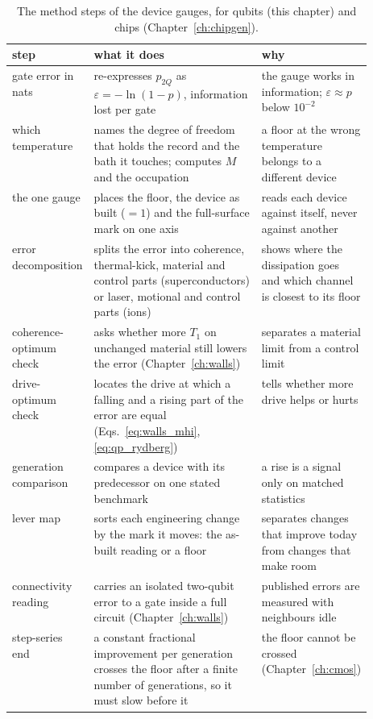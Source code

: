 \begin{table}[htbp]\centering\small
\caption{The method steps of the device gauges, for qubits (this chapter) and chips (Chapter~\ref{ch:chipgen}).}\label{tab:qp_steps}
\begin{tabularx}{\linewidth}{@{}>{\raggedright\arraybackslash}p{0.22\linewidth}>{\raggedright\arraybackslash}X>{\raggedright\arraybackslash}p{0.30\linewidth}@{}}\toprule
step & what it does & why \\\midrule
gate error in nats & re-expresses $p_{2Q}$ as $\varepsilon=-\ln(1-p)$, information lost per gate & the gauge works in information; $\varepsilon\approx p$ below $10^{-2}$ \\
which temperature & names the degree of freedom that holds the record and the bath it touches; computes $M$ and the occupation & a floor at the wrong temperature belongs to a different device \\
the one gauge & places the floor, the device as built ($=1$) and the full-surface mark on one axis & reads each device against itself, never against another \\
error decomposition & splits the error into coherence, thermal-kick, material and control parts (superconductors) or laser, motional and control parts (ions) & shows where the dissipation goes and which channel is closest to its floor \\
coherence-optimum check & asks whether more $T_1$ on unchanged material still lowers the error (Chapter~\ref{ch:walls}) & separates a material limit from a control limit \\
drive-optimum check & locates the drive at which a falling and a rising part of the error are equal (Eqs.~\eqref{eq:walls_mhi}, \eqref{eq:qp_rydberg}) & tells whether more drive helps or hurts \\
generation comparison & compares a device with its predecessor on one stated benchmark & a rise is a signal only on matched statistics~\cite{Proctor2022,McKay2023} \\
lever map & sorts each engineering change by the mark it moves: the as-built reading or a floor & separates changes that improve today from changes that make room \\
connectivity reading & carries an isolated two-qubit error to a gate inside a full circuit (Chapter~\ref{ch:walls}) & published errors are measured with neighbours idle \\
step-series end & a constant fractional improvement per generation crosses the floor after a finite number of generations, so it must slow before it & the floor cannot be crossed (Chapter~\ref{ch:cmos}) \\\bottomrule
\end{tabularx}
\end{table}

